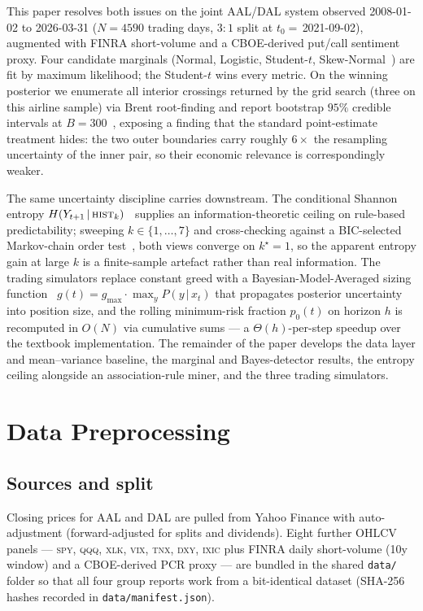 \documentclass[runningheads]{llncs}
\begin{document}
This paper resolves both issues on the joint AAL/DAL system observed
2008-01-02 to 2026-03-31 ($N{=}\num{4590}$ trading days, $3{:}1$
split at $t_{0}{=}\,$2021-09-02), augmented with FINRA short-volume
and a CBOE-derived put/call sentiment proxy. Four candidate marginals
(Normal, Logistic, Student-$t$, Skew-Normal~\cite{azzalini1985}) are
fit by maximum likelihood; the Student-$t$ wins every metric. On the
winning posterior we enumerate all interior crossings returned by the
grid search (three on this airline sample) via Brent root-finding and report bootstrap
$95\%$ credible intervals at $B{=}\num{300}$~\cite{efron1979},
exposing a finding that the standard point-estimate treatment hides:
the two outer boundaries carry roughly $6\!\times$ the resampling
uncertainty of the inner pair, so their economic relevance is
correspondingly weaker.

The same uncertainty discipline carries downstream. The conditional
Shannon entropy
$H(Y_{t+1}\,|\,\textsc{hist}_{k})$~\cite{shannon1948,coverthomas2006}
supplies an information-theoretic ceiling on rule-based
predictability; sweeping $k\in\{1,\dots,7\}$ and cross-checking
against a BIC-selected Markov-chain order test~\cite{tongbreak1990},
both views converge on $k^{\star}{=}1$, so the apparent entropy gain
at large $k$ is a finite-sample artefact rather than real
information. The trading simulators replace constant greed with a
Bayesian-Model-Averaged sizing function~\cite{hoeting1999bma}
$g(t){=}g_{\max}\!\cdot\!\max_{y}P(y\,|\,x_{t})$ that propagates
posterior uncertainty into position size, and the rolling
minimum-risk fraction $p_{0}(t)$ on horizon $h$ is recomputed in
$O(N)$ via cumulative sums --- a $\Theta(h)$-per-step speedup over
the textbook implementation. The remainder of the paper develops the
data layer and mean--variance baseline, the marginal and
Bayes-detector results, the entropy ceiling alongside an
association-rule miner, and the three trading simulators.

\section{Data Preprocessing}\label{sec:data}
\subsection{Sources and split}\label{sec:data:src}
Closing prices for AAL and DAL are pulled from Yahoo Finance with
auto-adjustment (forward-adjusted for splits and dividends).
Eight further OHLCV panels --- \textsc{spy}, \textsc{qqq},
\textsc{xlk}, \textsc{vix}, \textsc{tnx}, \textsc{dxy}, \textsc{ixic}
plus FINRA daily short-volume (10y window) and a CBOE-derived
PCR proxy --- are bundled in the shared \texttt{data/} folder so that
all four group reports work from a bit-identical dataset
(SHA-256 hashes recorded in \texttt{data/manifest.json}).
\end{document}
